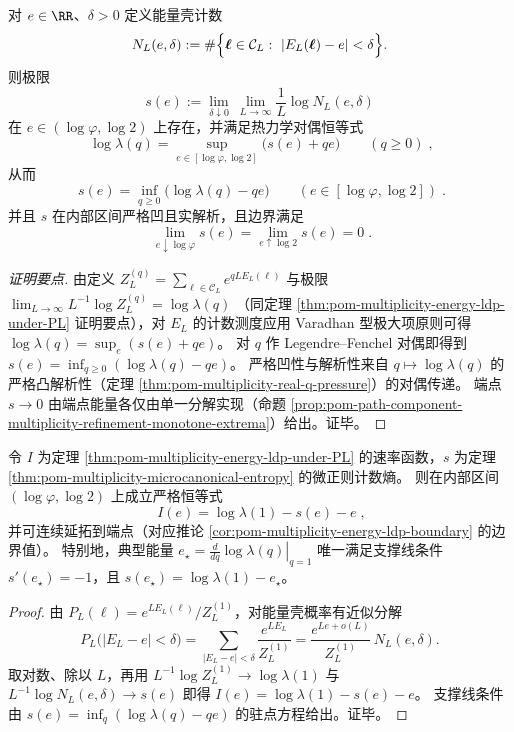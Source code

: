 \begin{theorem}[微正则计数熵的存在与全闭式对偶]\label{thm:pom-multiplicity-microcanonical-entropy}
对 \(e\in\RR\)、\(\delta>0\) 定义能量壳计数
\[
N_L(e,\delta):=\#\Bigl\{\boldsymbol{\ell}\in\mathcal{C}_L:\ |E_L(\boldsymbol{\ell})-e|<\delta\Bigr\}.
\]
则极限
\[
s(e):=\lim_{\delta\downarrow 0}\ \lim_{L\to\infty}\frac{1}{L}\log N_L(e,\delta)
\]
在 \(e\in(\log\varphi,\log 2)\) 上存在，并满足热力学对偶恒等式
\[
\boxed{\;
\log\lambda(q)=\sup_{e\in[\log\varphi,\log 2]}\bigl(s(e)+q e\bigr)\qquad(q\ge 0)\; } ,
\]
从而
\[
\boxed{\;
s(e)=\inf_{q\ge 0}\bigl(\log\lambda(q)-q e\bigr)\qquad(e\in[\log\varphi,\log 2])\; } .
\]
并且 \(s\) 在内部区间严格凹且实解析，且边界满足
\[
\boxed{\;
\lim_{e\downarrow \log\varphi}s(e)=\lim_{e\uparrow \log 2}s(e)=0\; } .
\]
\end{theorem}
\begin{proof}[证明要点]
由定义 \(Z_L^{(q)}=\sum_{\boldsymbol{\ell}\in\mathcal{C}_L}e^{qLE_L(\boldsymbol{\ell})}\) 与极限
\(
\lim_{L\to\infty}L^{-1}\log Z_L^{(q)}=\log\lambda(q)
\)
（同定理 \ref{thm:pom-multiplicity-energy-ldp-under-PL} 证明要点），对 \(E_L\) 的计数测度应用 Varadhan 型极大项原则可得
\(
\log\lambda(q)=\sup_e(s(e)+q e)
\)。
对 \(q\) 作 Legendre--Fenchel 对偶即得到 \(s(e)=\inf_{q\ge 0}(\log\lambda(q)-q e)\)。
严格凹性与解析性来自 \(q\mapsto\log\lambda(q)\) 的严格凸解析性（定理 \ref{thm:pom-multiplicity-real-q-pressure}）的对偶传递。
端点 \(s\to 0\) 由端点能量各仅由单一分解实现（命题 \ref{prop:pom-path-component-multiplicity-refinement-monotone-extrema}）给出。证毕。
\end{proof}

\begin{corollary}\label{cor:pom-multiplicity-gibbs-identity}
令 \(I\) 为定理 \ref{thm:pom-multiplicity-energy-ldp-under-PL} 的速率函数，\(s\) 为定理 \ref{thm:pom-multiplicity-microcanonical-entropy} 的微正则计数熵。
则在内部区间 \((\log\varphi,\log 2)\) 上成立严格恒等式
\[
\boxed{\;
I(e)=\log\lambda(1)-s(e)-e\; } ,
\]
并可连续延拓到端点（对应推论 \ref{cor:pom-multiplicity-energy-ldp-boundary} 的边界值）。
特别地，典型能量
\(
e_\star=\left.\frac{d}{dq}\log\lambda(q)\right|_{q=1}
\)
唯一满足支撑线条件
\(
s'(e_\star)=-1
\)，且
\(
s(e_\star)=\log\lambda(1)-e_\star
\)。
\end{corollary}
\begin{proof}
由 \(P_L(\boldsymbol{\ell})=e^{LE_L(\boldsymbol{\ell})}/Z_L^{(1)}\)，对能量壳概率有近似分解
\[
P_L\bigl(|E_L-e|<\delta\bigr)
=\sum_{|E_L-e|<\delta}\frac{e^{LE_L}}{Z_L^{(1)}}
=\frac{e^{Le+o(L)}}{Z_L^{(1)}}\,N_L(e,\delta).
\]
取对数、除以 \(L\)，再用 \(L^{-1}\log Z_L^{(1)}\to\log\lambda(1)\) 与 \(L^{-1}\log N_L(e,\delta)\to s(e)\) 即得
\(
I(e)=\log\lambda(1)-s(e)-e
\)。
支撑线条件由 \(s(e)=\inf_q(\log\lambda(q)-q e)\) 的驻点方程给出。证毕。
\end{proof}

